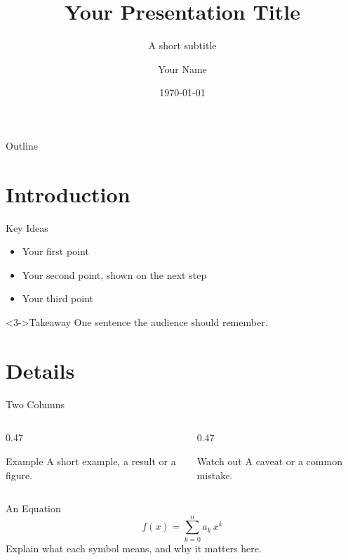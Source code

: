 \documentclass[aspectratio=43]{beamer}
\title{Your Presentation Title}
\subtitle{A short subtitle}
\author{Your Name}
\institute{Your Institution}
\date{\today}
\begin{document}
\begin{frame}
  \titlepage
\end{frame}

\begin{frame}{Outline}
  \tableofcontents
\end{frame}

\section{Introduction}
\begin{frame}{Key Ideas}
  \begin{itemize}
    \item<1-> Your first point
    \item<2-> Your second point, shown on the next step
    \item<3-> Your third point
  \end{itemize}
  \vspace{0.6em}
  \begin{block}<3->{Takeaway}
    One sentence the audience should remember.
  \end{block}
\end{frame}

\section{Details}
\begin{frame}{Two Columns}
  \begin{columns}[T]
    \begin{column}{0.47\textwidth}
      \begin{exampleblock}{Example}
        A short example, a result or a figure.
      \end{exampleblock}
    \end{column}
    \begin{column}{0.47\textwidth}
      \begin{alertblock}{Watch out}
        A caveat or a common mistake.
      \end{alertblock}
    \end{column}
  \end{columns}
\end{frame}

\begin{frame}{An Equation}
  \begin{equation*}
    f(x) = \sum_{k=0}^{n} a_k\, x^k
  \end{equation*}
  Explain what each symbol means, and why it matters here.
\end{frame}
\end{document}

